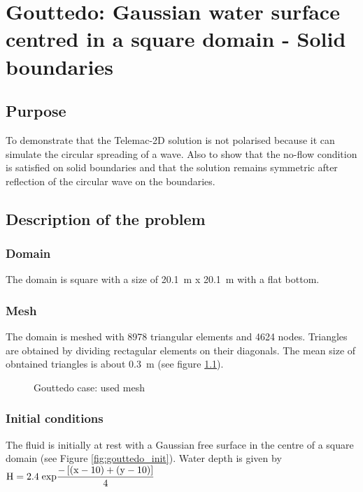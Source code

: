 \chapter{Gouttedo: Gaussian water surface centred in a square domain - Solid boundaries}
%
%
\section{Purpose}
%
To demonstrate that the Telemac-2D solution is not polarised because it can
simulate the circular spreading of a wave. Also to show that the no-flow
condition is satisfied on solid boundaries and that the solution remains
symmetric after reflection of the circular wave on the boundaries.

%
\section{Description of the problem}
%
\subsection{Domain}
The domain is square with a size of  20.1~m x 20.1~m with a flat bottom.
\subsection{Mesh}
The domain is meshed with 8978 triangular elements and 4624 nodes. Triangles
are obtained by dividing rectagular elements on their diagonals. The mean size
of obntained triangles is about 0.3~m (see figure \ref{fig:gouttedo_mesh}).
\begin{figure}[h]
\begin{center}
\end{center}
\caption{Gouttedo case: used mesh}
\label{fig:gouttedo_mesh}

\end{figure}

\subsection{Initial conditions}
The fluid is initially at rest with a Gaussian free surface in the centre of a
square domain (see Figure \ref{fig:gouttedo_init}). Water depth is given by
${\rm H= 2.4\; exp}\dfrac{{\rm -}\left[{\rm (x-10)}+({\rm y-10)}\right]}{{\rm 4}} $

